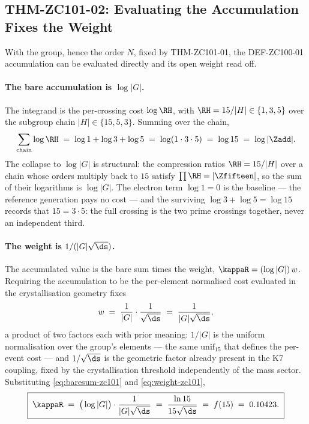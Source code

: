 \documentclass[12pt, a4paper]{article}
\begin{document}
\subsection{THM-ZC101-02: Evaluating the Accumulation Fixes the Weight}
\label{sec:weight-zc101}
With the group, hence the order $N$, fixed by THM-ZC101-01, the DEF-ZC100-01
accumulation can be evaluated directly and its open weight read off.

\paragraph{The bare accumulation is $\log|G|$.}
The integrand is the per-crossing cost $\log\RH$, with $\RH=15/|H|\in\{1,3,5\}$
over the subgroup chain $|H|\in\{15,5,3\}$. Summing over the chain,
\begin{equation}
  \sum_{\text{chain}} \log\RH
   \;=\; \log 1 + \log 3 + \log 5
   \;=\; \log(1\cdot 3\cdot 5)
   \;=\; \log 15
   \;=\; \log|\Zadd|.
  \label{eq:baresum-zc101}
\end{equation}
The collapse to $\log|G|$ is structural: the compression ratios $\RH=15/|H|$
over a chain whose orders multiply back to $15$ satisfy $\prod\RH=|\Zfifteen|$,
so the sum of their logarithms is $\log|G|$. The electron term $\log 1=0$ is the
baseline --- the reference generation pays no cost --- and the surviving
$\log 3+\log 5=\log 15$ records that $15=3\cdot 5$: the full crossing is the two
prime crossings together, never an independent third.

\paragraph{The weight is $1/(|G|\sqrt{\ds})$.}
The accumulated value is the bare sum times the weight,
$\kappaR=(\log|G|)\,w$. Requiring the accumulation to be the per-element
normalised cost evaluated in the crystallisation geometry fixes
\begin{equation}
  w \;=\; \frac{1}{|G|}\cdot\frac{1}{\sqrt{\ds}}
    \;=\; \frac{1}{|G|\sqrt{\ds}},
  \label{eq:weight-zc101}
\end{equation}
a product of two factors each with prior meaning: $1/|G|$ is the uniform
normalisation over the group's elements --- the same $\mathrm{unif}_{15}$ that
defines the per-event cost --- and $1/\sqrt{\ds}$ is the geometric factor already
present in the K7 coupling, fixed by the crystallisation threshold independently
of the mass sector. Substituting \eqref{eq:baresum-zc101} and \eqref{eq:weight-zc101},
\begin{equation}
  \boxed{\;\kappaR \;=\; \big(\log|G|\big)\cdot\frac{1}{|G|\sqrt{\ds}}
    \;=\; \frac{\ln 15}{15\sqrt{\ds}} \;=\; f(15) \;=\; 0.10423.\;}
\end{equation}
\end{document}
